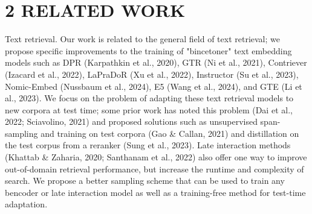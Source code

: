 \section*{2 RELATED WORK}
Text retrieval. Our work is related to the general field of text retrieval; we propose specific improvements to the training of "bincetoner" text embedding models such as DPR (Karpathkin et al., 2020), GTR (Ni et al., 2021), Contriever (Izacard et al., 2022), LaPraDoR (Xu et al., 2022), Instructor (Su et al., 2023), Nomic-Embed (Nussbaum et al., 2024), E5 (Wang et al., 2024), and GTE (Li et al., 2023). We focus on the problem of adapting these text retrieval models to new corpora at test time; some prior work has noted this problem (Dai et al., 2022; Sciavolino, 2021) and proposed solutions such as unsupervised span-sampling and training on test corpora (Gao \& Callan, 2021) and distillation on the test corpus from a reranker (Sung et al., 2023). Late interaction methods (Khattab \& Zaharia, 2020; Santhanam et al., 2022) also offer one way to improve out-of-domain retrieval performance, but increase the runtime and complexity of search. We propose a better sampling scheme that can be used to train any bencoder or late interaction model as well as a training-free method for test-time adaptation.

